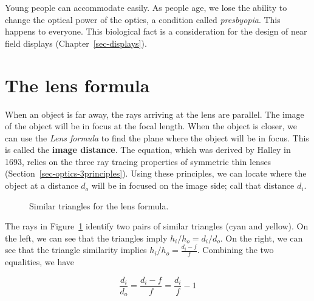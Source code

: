 \documentclass[
  letterpaper,
]{book}
\begin{document}
Young people can accommodate easily. As people age, we lose the ability
to change the optical power of the optics, a condition called
\emph{presbyopia}. This happens to everyone. This biological fact is a
consideration for the design of near field displays
(Chapter~\ref{sec-displays}).

\section{The lens formula}\label{sec-lens-formula}

When an object is far away, the rays arriving at the lens are parallel.
The image of the object will be in focus at the focal length. When the
object is closer, we can use the \emph{Lens formula} to find the plane
where the object will be in focus. This is called the \textbf{image
distance}. The equation, which was derived by Halley in 1693, relies on
the three ray tracing properties of symmetric thin lenses
(Section~\ref{sec-optics-3principles}). Using these principles, we can
locate where the object at a distance \(d_o\) will be in focused on the
image side; call that distance \(d_i\).

\begin{figure}


\caption{\label{fig-lens-formula-similartriangles}Similar triangles for
the lens formula.}

\end{figure}%

The rays in Figure~\ref{fig-lens-formula-similartriangles} identify two
pairs of similar triangles (cyan and yellow). On the left, we can see
that the triangles imply \(h_i/h_o = d_i/d_o\). On the right, we can see
that the triangle similarity implies \(h_i/h_o = \frac{d_i - f}{f}\).
Combining the two equalities, we have

\[\frac{d_i}{d_o} = \frac{d_i - f}{f} = \frac{d_i}{f} - 1 \]
\end{document}
